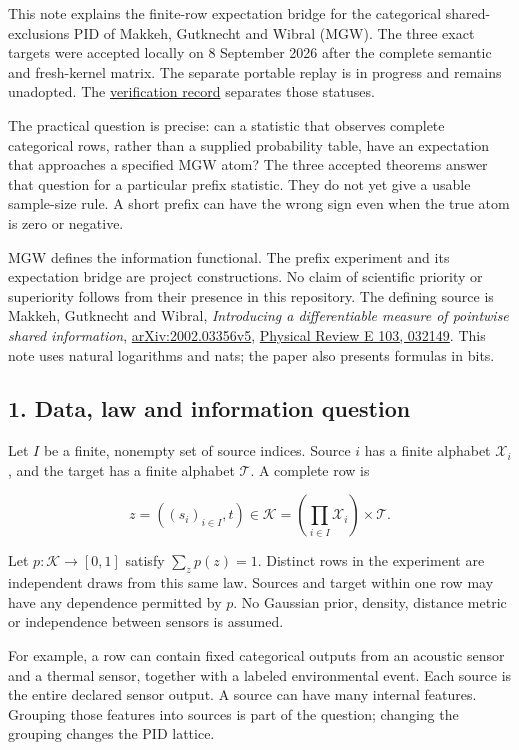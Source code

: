 This note explains the finite-row expectation bridge for the categorical shared-exclusions PID of Makkeh, Gutknecht and Wibral (MGW). The three exact targets were accepted locally on 8 September 2026 after the complete semantic and fresh-kernel matrix. The separate portable replay is in progress and remains unadopted. The \href{../../evidence/prefix-mgw-mean-formal-verification-2026-09-08/RESULTS.md}{verification record} separates those statuses.

The practical question is precise: can a statistic that observes complete categorical rows, rather than a supplied probability table, have an expectation that approaches a specified MGW atom? The three accepted theorems answer that question for a particular prefix statistic. They do not yet give a usable sample-size rule. A short prefix can have the wrong sign even when the true atom is zero or negative.

MGW defines the information functional. The prefix experiment and its expectation bridge are project constructions. No claim of scientific priority or superiority follows from their presence in this repository. The defining source is Makkeh, Gutknecht and Wibral, \emph{Introducing a differentiable measure of pointwise shared information}, \href{https://arxiv.org/abs/2002.03356v5}{arXiv:2002.03356v5}, \href{https://doi.org/10.1103/PhysRevE.103.032149}{Physical Review E 103, 032149}. This note uses natural logarithms and nats; the paper also presents formulas in bits.

\subsection{1. Data, law and information question}\label{data-law-and-information-question}

Let \(I\) be a finite, nonempty set of source indices. Source \(i\) has a finite alphabet \(\mathcal X_i\), and the target has a finite alphabet \(\mathcal T\). A complete row is

\[
z=((s_i)_{i\in I},t)\in\mathcal K
   =\left(\prod_{i\in I}\mathcal X_i\right)\times\mathcal T.
\]

Let \(p:\mathcal K\to[0,1]\) satisfy \(\sum_zp(z)=1\). Distinct rows in the experiment are independent draws from this same law. Sources and target within one row may have any dependence permitted by \(p\). No Gaussian prior, density, distance metric or independence between sensors is assumed.

For example, a row can contain fixed categorical outputs from an acoustic sensor and a thermal sensor, together with a labeled environmental event. Each source is the entire declared sensor output. A source can have many internal features. Grouping those features into sources is part of the question; changing the grouping changes the PID lattice.

